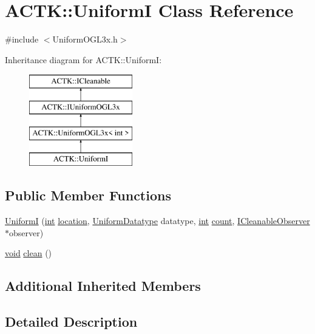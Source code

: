 \hypertarget{class_a_c_t_k_1_1_uniform_i}{\section{A\-C\-T\-K\-:\-:Uniform\-I Class Reference}
\label{class_a_c_t_k_1_1_uniform_i}
}


{\ttfamily \#include $<$Uniform\-O\-G\-L3x.\-h$>$}

Inheritance diagram for A\-C\-T\-K\-:\-:Uniform\-I\-:\begin{figure}[H]
\begin{center}
\leavevmode
\includegraphics[height=4.000000cm]{class_a_c_t_k_1_1_uniform_i}
\end{center}
\end{figure}
\subsection*{Public Member Functions}
\begin{DoxyCompactItemize}
\item 
\hyperlink{class_a_c_t_k_1_1_uniform_i_a62533f722171059e13a136689eea0b37}{Uniform\-I} (\hyperlink{wglew_8h_a500a82aecba06f4550f6849b8099ca21}{int} \hyperlink{glew_8h_a050778a7129cc14e57da7024beb87ce8}{location}, \hyperlink{namespace_a_c_t_k_a0206df759d1628359ad73c2acea69d0e}{Uniform\-Datatype} datatype, \hyperlink{wglew_8h_a500a82aecba06f4550f6849b8099ca21}{int} \hyperlink{glew_8h_a10b284d589000663becfbc6867a3a9f7}{count}, \hyperlink{class_a_c_t_k_1_1_i_cleanable_observer}{I\-Cleanable\-Observer} $\ast$observer)
\item 
\hyperlink{wglew_8h_aeea6e3dfae3acf232096f57d2d57f084}{void} \hyperlink{class_a_c_t_k_1_1_uniform_i_a1089ffd6349d9c149bf87b0198fe023b}{clean} ()
\end{DoxyCompactItemize}
\subsection*{Additional Inherited Members}


\subsection{Detailed Description}


